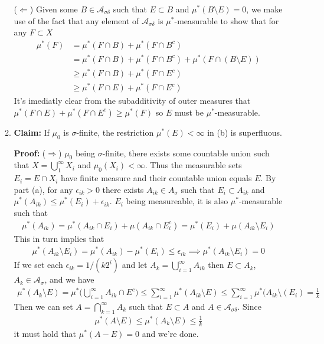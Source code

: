 \documentclass[11pt,letter]{article}
\begin{document}
\begin{enumerate}
\begin{enumerate}
        ($\Leftarrow$) Given some $B \in \mathcal{A}_{\sigma\delta}$ such that $E \subset B$ and $\mu^*(B\setminus E) = 0$, we make use of the fact that any element of $\mathcal{A}_{\sigma\delta}$ is $\mu^*$-measurable to show that for any $F \subset X$
        \begin{align*}
            \mu^*(F) & = \mu^*(F \cap B) + \mu^*(F \cap B^c)\\ 
            & = \mu^*(F \cap B) + \mu^*(F \cap B^c) + \mu^*(F \cap (B\setminus E)) \\
            & \ge \mu^*(F \cap B) + \mu^*(F \cap E^c) \\
            & \ge \mu^*(F \cap E) + \mu^*(F \cap E^c)
        \end{align*}
        It's imediatly clear from the subadditivity of outer measures that $\mu^*(F \cap E) + \mu^*(F \cap E^c) \ge \mu^*(F)$ so $E$ must be $\mu^*$-measurable.

        \item \textbf{Claim:} If $\mu_0$ is $\sigma$-finite, the restriction $\mu^*(E) < \infty$ in (b) is superfluous.

        \textbf{Proof:} ($\Rightarrow$) $\mu_0$ being $\sigma$-finite, there exists some countable union such that $X = \bigcup_1^\infty X_i$ and $\mu_0(X_i) < \infty$. Thus the measurable sets $E_i = E \cap X_i$ have finite measure and their countable union equals $E$. By part (a), for any $\epsilon_{ik} > 0$ there exists $A_{ik} \in A_\sigma$ such that $E_i \subset A_{ik}$ and $\mu^*(A_{ik}) \le \mu^*(E_i) + \epsilon_{ik}$. $E_i$ being measureable, it is also $\mu^*$-measurable such that
        \begin{align*}
            \mu^*(A_{ik}) = \mu^*(A_{ik} \cap E_i) + \mu(A_{ik} \cap E_i^c) = \mu^*(E_i) + \mu(A_{ik} \setminus E_i)
        \end{align*}
        This in turn implies that
        \begin{align*}
            \mu^*(A_{ik}\setminus E_i) = \mu^*(A_{ik}) - \mu^*(E_i) \le \epsilon_{ik}
            \implies \mu^*(A_{ik}\setminus E_i) = 0
        \end{align*}
        If we set each $\epsilon_{ik} = 1/(k2^i)$ and let $A_k = \bigcup_{i=1}^\infty A_{ik}$ then $E \subset A_k$, $A_k \in \mathcal{A}_\sigma$, and we have
        \begin{align*}
            \mu^*(A_k \setminus E) = \mu^*\Big(\bigcup_{i=1}^\infty A_{ik} \cap E^c \Big) \le \sum_{i=1}^\infty \mu^*(A_{ik} \setminus E) \le \sum_{i=1}^\infty \mu^*(A_{ik} \setminus (E_i) = \frac{1}{k}
        \end{align*}
        Then we can set $A = \bigcap_{k=1}^\infty A_k$ such that $E \subset A$ and $A \in \mathcal{A}_{\sigma\delta}$. Since
        \begin{align*}
            \mu^*(A \setminus E) \le \mu^*(A_k \setminus E) \le \frac{1}{k}
        \end{align*}
        it must hold that $\mu^*(A - E) = 0$ and we're done.


\end{enumerate}
\end{enumerate}
\end{document}
